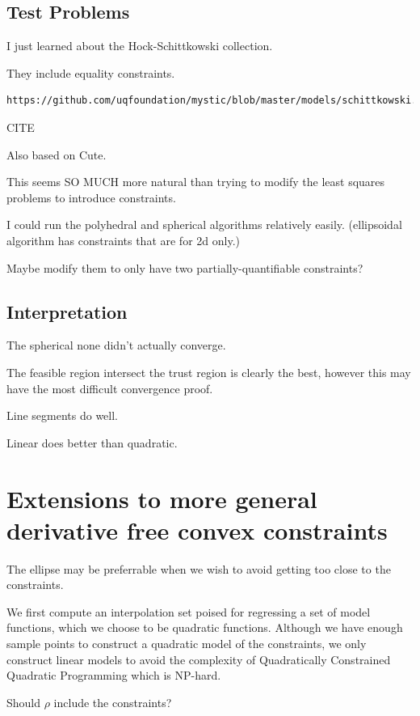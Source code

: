 \documentclass{article}
\begin{document}
\subsection{Test Problems}

I just learned about the Hock-Schittkowski collection.

They include equality constraints.

\begin{verbatim}
https://github.com/uqfoundation/mystic/blob/master/models/schittkowski.py
\end{verbatim}

CITE

Also based on Cute.

This seems SO MUCH more natural than trying to modify the least squares problems to introduce constraints.

I could run the polyhedral and spherical algorithms relatively easily. (ellipsoidal algorithm has constraints that are for 2d only.)

Maybe modify them to only have two partially-quantifiable constraints?



\newpage

\subsection{Interpretation}

The spherical none didn't actually converge.

The feasible region intersect the trust region is clearly the best, however this may have the most difficult convergence proof.

Line segments do well.

Linear does better than quadratic.


\section{Extensions to more general derivative free convex constraints}


The ellipse may be preferrable when we wish to avoid getting too close to the constraints.

We first compute an interpolation set poised for regressing a set of model functions, which we choose to be quadratic functions.
Although we have enough sample points to construct a quadratic model of the constraints, we only construct linear models to avoid the complexity of Quadratically Constrained Quadratic Programming which is NP-hard.

Should $\rho$ include the constraints?



\newpage

\appendix



\newpage



\end{document}
